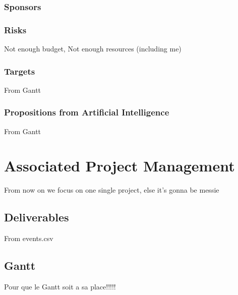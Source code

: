 \documentclass[8pt]{article} %
\begin{document}
\subsubsection{Sponsors}

\subsubsection{Risks}
Not enough budget, Not enough resources (including me)
\subsubsection{Targets}
From Gantt
\subsubsection{Propositions from Artificial Intelligence}
From Gantt


\section{Associated Project Management}

From now on we focus on one single project, else it's gonna be messie 
\subsection{Deliverables}
From events.csv
\subsection{Gantt}
Pour que le Gantt soit a sa place!!!!!
%
\end{document}
